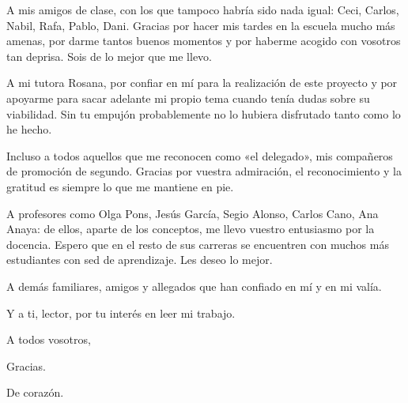 A mis amigos de clase, con los que tampoco habría sido nada igual: Ceci, Carlos, Nabil, Rafa, Pablo, Dani. Gracias por hacer mis tardes en la escuela mucho más amenas, por darme tantos buenos momentos y por haberme acogido con vosotros tan deprisa. Sois de lo mejor que me llevo.

A mi tutora Rosana, por confiar en mí para la realización de este proyecto y por apoyarme para sacar adelante mi propio tema cuando tenía dudas sobre su viabilidad. Sin tu empujón probablemente no lo hubiera disfrutado tanto como lo he hecho.

Incluso a todos aquellos que me reconocen como «el delegado», mis compañeros de promoción de segundo. Gracias por vuestra admiración, el reconocimiento y la gratitud es siempre lo que me mantiene en pie.

A profesores como Olga Pons, Jesús García, Segio Alonso, Carlos Cano, Ana Anaya: de ellos, aparte de los conceptos, me llevo vuestro entusiasmo por la docencia. Espero que en el resto de sus carreras se encuentren con muchos más estudiantes con sed de aprendizaje. Les deseo lo mejor.

A demás familiares, amigos y allegados que han confiado en mí y en mi valía.

Y a ti, lector, por tu interés en leer mi trabajo.

A todos vosotros,

Gracias.

De corazón.


